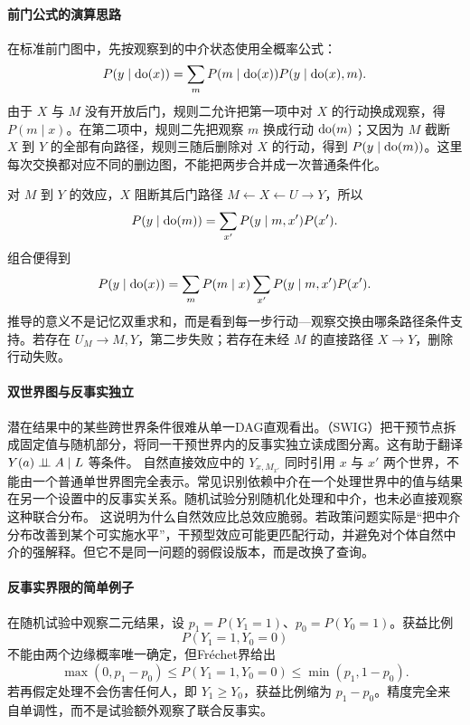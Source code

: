 \paragraph{前门公式的演算思路}

在标准前门图中，先按观察到的中介状态使用全概率公式：
\[
P(y\mid\operatorname{do}(x))=\sum_m P(m\mid\operatorname{do}(x))
P(y\mid\operatorname{do}(x),m).
\]
由于 $X$ 与 $M$ 没有开放后门，规则二允许把第一项中对 $X$ 的行动换成观察，得 $P(m\mid x)$。在第二项中，规则二先把观察 $m$ 换成行动 $\operatorname{do}(m)$；又因为 $M$ 截断 $X$ 到 $Y$ 的全部有向路径，规则三随后删除对 $X$ 的行动，得到 $P(y\mid\operatorname{do}(m))$。这里每次交换都对应不同的删边图，不能把两步合并成一次普通条件化。

对 $M$ 到 $Y$ 的效应，$X$ 阻断其后门路径 $M\leftarrow X\leftarrow U\rightarrow Y$，所以
\[
P(y\mid\operatorname{do}(m))=\sum_{x'}P(y\mid m,x')P(x').
\]
组合便得到
\[
P(y\mid\operatorname{do}(x))=\sum_m P(m\mid x)
\sum_{x'}P(y\mid m,x')P(x').
\]
推导的意义不是记忆双重求和，而是看到每一步行动---观察交换由哪条路径条件支持。若存在 $U_M\rightarrow M,Y$，第二步失败；若存在未经 $M$ 的直接路径 $X\rightarrow Y$，删除行动失败。

\paragraph{双世界图与反事实独立}

潜在结果中的某些跨世界条件很难从单一DAG直观看出。（SWIG）把干预节点拆成固定值与随机部分，将同一干预世界内的反事实独立读成图分离\parencite{richardsonrobins2013}。这有助于翻译 $Y(a)\mathrel{\perp\!\!\!\perp} A\mid L$ 等条件。
自然直接效应中的 $Y_{x,M_{x'}}$ 同时引用 $x$ 与 $x'$ 两个世界，不能由一个普通单世界图完全表示。常见识别依赖中介在一个处理世界中的值与结果在另一个设置中的反事实关系。随机试验分别随机化处理和中介，也未必直接观察这种联合分布。
这说明为什么自然效应比总效应脆弱。若政策问题实际是“把中介分布改善到某个可实施水平”，干预型效应可能更匹配行动，并避免对个体自然中介的强解释。但它不是同一问题的弱假设版本，而是改换了查询。

\paragraph{反事实界限的简单例子}

在随机试验中观察二元结果，设 $p_1=P(Y_1=1)$、$p_0=P(Y_0=1)$。获益比例
\[
P(Y_1=1,Y_0=0)
\]
不能由两个边缘概率唯一确定，但Fréchet界给出
\[
\max(0,p_1-p_0)\le P(Y_1=1,Y_0=0)
\le \min(p_1,1-p_0).
\]
若再假定处理不会伤害任何人，即 $Y_1\ge Y_0$，获益比例缩为 $p_1-p_0$。精度完全来自单调性，而不是试验额外观察了联合反事实。

